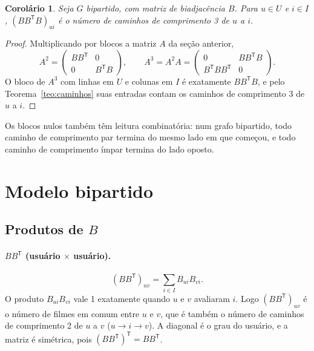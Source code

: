\documentclass[12pt,a4paper]{article}
\newtheorem{corolario}{Corolário}
\theoremstyle{definition}
\begin{document}
\begin{corolario}\label{cor:bbtb}
Seja $G$ bipartido, com matriz de biadjacência $B$. Para $u \in U$ e
$i \in I$, $(BB^{\mathsf T}B)_{ui}$ é o número de caminhos de comprimento 3
de $u$ a $i$.
\end{corolario}

\begin{proof}
Multiplicando por blocos a matriz $A$ da seção anterior,
\[
  A^2 = \begin{pmatrix} BB^{\mathsf T} & 0 \\ 0 & B^{\mathsf T}B \end{pmatrix},
  \qquad
  A^3 = A^2 A = \begin{pmatrix} 0 & BB^{\mathsf T}B \\
                               B^{\mathsf T}BB^{\mathsf T} & 0 \end{pmatrix}.
\]
O bloco de $A^3$ com linhas em $U$ e colunas em $I$ é exatamente
$BB^{\mathsf T}B$, e pelo Teorema~\ref{teo:caminhos} suas entradas contam
os caminhos de comprimento 3 de $u$ a $i$.
\end{proof}

Os blocos nulos também têm leitura combinatória: num grafo bipartido, todo
caminho de comprimento par termina do mesmo lado em que começou, e todo
caminho de comprimento ímpar termina do lado oposto.

\section{Modelo bipartido}\label{sec:bipartido}

\subsection{Produtos de $B$}

\paragraph{$BB^{\mathsf T}$ (usuário $\times$ usuário).}
\[
  (BB^{\mathsf T})_{uv} = \sum_{i \in I} B_{ui} B_{vi}.
\]
O produto $B_{ui}B_{vi}$ vale 1 exatamente quando $u$ e $v$ avaliaram $i$.
Logo $(BB^{\mathsf T})_{uv}$ é o número de filmes em comum entre $u$ e $v$,
que é também o número de caminhos de comprimento 2 de $u$ a $v$
($u \to i \to v$). A diagonal é o grau do usuário, e a matriz é simétrica,
pois $(BB^{\mathsf T})^{\mathsf T} = BB^{\mathsf T}$.
\end{document}
